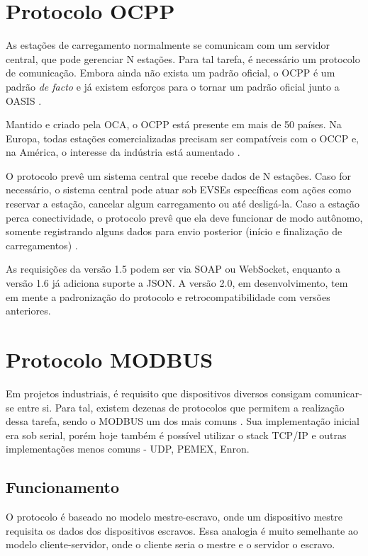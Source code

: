 \section{Protocolo OCPP}

As estações de carregamento normalmente se comunicam com um servidor central, que pode gerenciar N estações. Para tal tarefa, é necessário um protocolo de comunicação. Embora ainda não exista um padrão oficial, o \ac{OCPP} é um padrão \textit{de facto} e já existem esforços para o tornar um padrão oficial junto a \ac{OASIS} \cite{ocpp-news-standardization}.

Mantido e criado pela \ac{OCA}, o OCPP está presente em mais de 50 países. Na Europa, todas estações comercializadas precisam ser compatíveis com o OCCP e, na América, o interesse da indústria está aumentado \cite{ocpp-news-forbes}.

O protocolo prevê um sistema central que recebe dados de N estações. Caso for necessário, o sistema central pode atuar sob EVSEs específicas com ações como reservar a estação, cancelar algum carregamento ou até desligá-la. Caso a estação perca conectividade, o protocolo prevê que ela deve funcionar de modo autônomo, somente registrando alguns dados para envio posterior (início e finalização de carregamentos) \cite{ocpp-spec-15}.

As requisições da versão 1.5 podem ser via SOAP ou WebSocket, enquanto a versão 1.6 já adiciona suporte a JSON. A versão 2.0, em desenvolvimento, tem em mente a padronização do protocolo e retrocompatibilidade com versões anteriores.

\section{Protocolo MODBUS}

Em projetos industriais, é requisito que dispositivos diversos consigam comunicar-se entre si. Para tal, existem dezenas de protocolos que permitem a realização dessa tarefa, sendo o MODBUS um dos mais comuns \cite{modbus-spec-application}. Sua implementação inicial era sob serial, porém hoje também é possível utilizar o stack TCP/IP e outras implementações menos comuns - UDP, PEMEX, Enron.

\subsection{Funcionamento}

O protocolo é baseado no modelo mestre-escravo, onde um dispositivo mestre requisita os dados dos dispositivos escravos. Essa analogia é muito semelhante ao modelo cliente-servidor, onde o cliente seria o mestre e o servidor o escravo.

